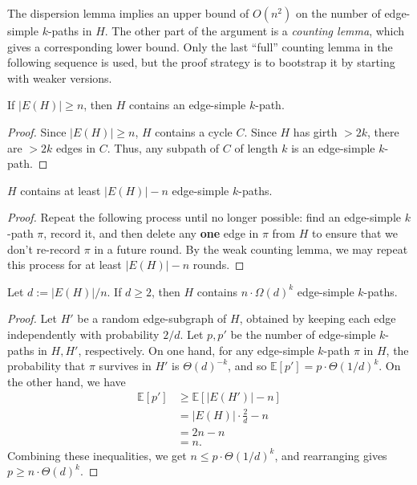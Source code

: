 \documentclass{article}\usepackage[a4paper,margin=20mm]{geometry}
\begin{document}
The dispersion lemma implies an upper bound of $O(n^2)$ on the number of edge-simple $k$-paths in $H$.
The other part of the argument is a \emph{counting lemma}, which gives a corresponding lower bound.
Only the last ``full'' counting lemma in the following sequence is used, but the proof strategy is to bootstrap it by starting with weaker versions.

\begin{lemma} 
If $|E(H)| \ge n$, then $H$ contains an edge-simple $k$-path.
\end{lemma}
\begin{proof}
Since $|E(H)| \ge n$, $H$ contains a cycle $C$.
Since $H$ has girth $>2k$, there are $>2k$ edges in $C$.
Thus, any subpath of $C$ of length $k$ is an edge-simple $k$-path.
\end{proof}


\begin{lemma} 
$H$ contains at least $|E(H)| - n$ edge-simple $k$-paths.
\end{lemma}
\begin{proof}
Repeat the following process until no longer possible: find an edge-simple $k$-path $\pi$, record it, and then delete any \textbf{one} edge in $\pi$ from $H$ to ensure that we don't re-record $\pi$ in a future round.
By the weak counting lemma, we may repeat this process for at least $|E(H)| - n$ rounds.
\end{proof}

\begin{lemma}  \label{lem:moorefc}
Let $d := |E(H)|/n$.
If $d \ge 2$, then $H$ contains $n \cdot \Omega(d)^k$ edge-simple $k$-paths.
\end{lemma}
\begin{proof}
Let $H'$ be a random edge-subgraph of $H$, obtained by keeping each edge independently with probability $2/d$.
Let $p, p'$ be the number of edge-simple $k$-paths in $H, H'$, respectively.
On one hand, for any edge-simple $k$-path $\pi$ in $H$, the probability that $\pi$ survives in $H'$ is $\Theta(d)^{-k}$, and so
$\mathbb{E}[p'] = p \cdot \Theta(1/d)^{k}$.
On the other hand, we have
\begin{align*}
\mathbb{E}[p'] &\ge \mathbb{E}[|E(H')| - n] \tag*{Medium Counting Lemma}\\
&= |E(H)| \cdot \frac{2}{d} - n\\
&= 2n - n\\
&= n.
\end{align*}
Combining these inequalities, we get $n \le p \cdot \Theta(1/d)^{k}$, and rearranging gives $p \ge n \cdot \Theta(d)^k$.
\end{proof}
\end{document}
